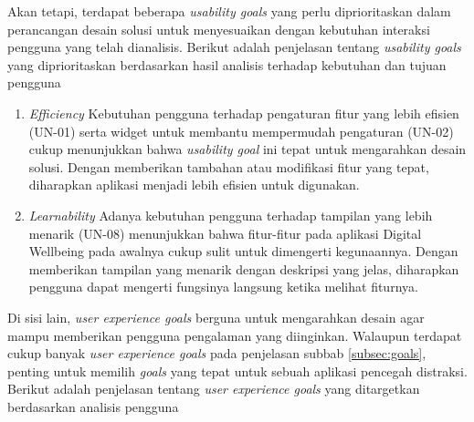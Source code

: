 Akan tetapi, terdapat beberapa \textit{usability goals} yang perlu diprioritaskan dalam perancangan desain solusi untuk menyesuaikan dengan kebutuhan interaksi pengguna yang telah dianalisis. Berikut adalah penjelasan tentang \textit{usability goals} yang diprioritaskan berdasarkan hasil analisis terhadap kebutuhan dan tujuan pengguna

\begin{enumerate}
  \item \textit{Efficiency}
  \subitem Kebutuhan pengguna terhadap pengaturan fitur yang lebih efisien (UN-01) serta widget untuk membantu mempermudah pengaturan (UN-02) cukup menunjukkan bahwa \textit{usability goal} ini tepat untuk mengarahkan desain solusi. Dengan memberikan tambahan atau modifikasi fitur yang tepat, diharapkan aplikasi menjadi lebih efisien untuk digunakan. 

  \item \textit{Learnability}
  \subitem Adanya kebutuhan pengguna terhadap tampilan yang lebih menarik (UN-08) menunjukkan bahwa fitur-fitur pada aplikasi Digital Wellbeing pada awalnya cukup sulit untuk dimengerti kegunaannya. Dengan memberikan tampilan yang menarik dengan deskripsi yang jelas, diharapkan pengguna dapat mengerti fungsinya langsung ketika melihat fiturnya.
  
\end{enumerate}

Di sisi lain, \textit{user experience goals} berguna untuk mengarahkan desain agar mampu memberikan pengguna pengalaman yang diinginkan. Walaupun terdapat cukup banyak \textit{user experience goals} pada penjelasan subbab \ref{subsec:goals}, penting untuk memilih \textit{goals} yang tepat untuk sebuah aplikasi pencegah distraksi. Berikut adalah penjelasan tentang \textit{user experience goals} yang ditargetkan berdasarkan analisis pengguna

